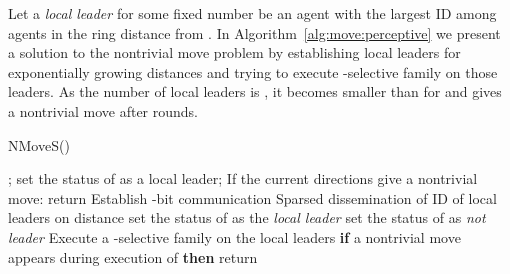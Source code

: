 Let a {\em local leader} for some fixed number  be an agent  with the largest ID among agents
in the ring distance  from .
In Algorithm~\ref{alg:move:perceptive} we present a solution to the nontrivial move
problem by establishing local leaders for exponentially growing distances  and trying
to execute -selective family on those leaders. As the number of local leaders is
, it becomes smaller than  for  and gives a nontrivial
move after  rounds.

\begin{algorithm}[]
	\caption{NMoveS()}
	\label{alg:move:perceptive}
	\begin{algorithmic}[1]
    \State ; set the status of  as a local leader;
		\State \SingleRound
    \State If the current directions give a nontrivial move: return
\State Establish -bit communication
    \For{}
        \State Sparsed dissemination of ID of local leaders on distance 
        \If{}
            \State set the status of  as the {\em local leader}
\Else
            \State set the status of  as {\em not leader}
\EndIf
\State Execute a -selective family  on the local leaders
        \State \textbf{if} a nontrivial move appears during execution of  \textbf{then} return
    \EndFor
\end{algorithmic}
\end{algorithm}



